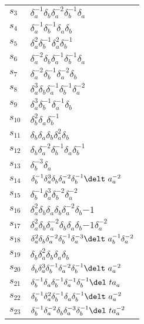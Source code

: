 \documentclass{article}
\begin{document}
\begin{center}
\begin{tabular}{ll}
$s_{3}$ & $\delta_a^{-1}\delta_b^{}\delta_a^{-2}\delta_b^{-1}\delta_a^{}$ \\
$s_{4}$ & $\delta_a^{-1}\delta_b^{-1}\delta_a^{}\delta_b^{}$ \\
$s_{5}$ & $\delta_a^{2}\delta_b^{-1}\delta_a^{2}\delta_b^{-1}$ \\
$s_{6}$ & $\delta_a^{-2}\delta_b^{}\delta_a^{-1}\delta_b^{-1}\delta_a^{}$ \\
$s_{7}$ & $\delta_a^{-2}\delta_b^{-1}\delta_a^{-2}\delta_b^{}$ \\
$s_{8}$ & $\delta_a^{3}\delta_b^{}\delta_a^{-1}\delta_b^{-1}\delta_a^{-2}$ \\
$s_{9}$ & $\delta_a^{3}\delta_b^{-1}\delta_a^{-1}\delta_b^{}$ \\
$s_{10}$ & $\delta_b^{2}\delta_a^{}\delta_b^{-1}$ \\
$s_{11}$ & $\delta_b^{}\delta_a^{}\delta_b^{}\delta_a^{2}\delta_b^{}$ \\
$s_{12}$ & $\delta_b^{}\delta_a^{-2}\delta_b^{-1}\delta_a^{}\delta_b^{-1}$ \\
$s_{13}$ & $\delta_b^{-3}\delta_a^{}$ \\
$s_{14}$ & $\delta_b^{-1}\delta_a^{3}\delta_b^{}\delta_a^{-2}\delta_b^{-1}\delt\
a_a^{-2}$ \\
$s_{15}$ & $\delta_b^{-1}\delta_a^{3}\delta_b^{-2}\delta_a^{-2}$ \\
$s_{16}$ & $\delta_a^{2}\delta_b^{}\delta_a^{}\delta_b^{}\delta_a^{-2}\delta_b^\
{-1}$ \\
$s_{17}$ & $\delta_a^{2}\delta_b^{}\delta_a^{-2}\delta_b^{}\delta_a^{}\delta_b^\
{-1}\delta_a^{-2}$ \\
$s_{18}$ & $\delta_a^{2}\delta_b^{}\delta_a^{-2}\delta_b^{-1}\delta_a^{-3}\delt\
a_b^{-1}\delta_a^{-2}$ \\
$s_{19}$ & $\delta_b^{}\delta_a^{2}\delta_b^{}\delta_a^{}\delta_b^{}$ \\
$s_{20}$ & $\delta_b^{}\delta_a^{3}\delta_b^{-1}\delta_a^{-2}\delta_b^{-1}\delt\
a_a^{-2}$ \\
$s_{21}$ & $\delta_b^{-1}\delta_a^{}\delta_b^{-1}\delta_a^{-1}\delta_b^{-1}\del\
ta_a^{}$ \\
$s_{22}$ & $\delta_b^{-1}\delta_a^{2}\delta_b^{-1}\delta_a^{}\delta_b^{-1}\delt\
a_a^{-2}$ \\
$s_{23}$ & $\delta_b^{-1}\delta_a^{-2}\delta_b^{}\delta_a^{-3}\delta_b^{-1}\del\
ta_a^{-2}$ \\
\bottomrule
\end{tabular}
\end{center}

\thispagestyle{empty}
\end{document}
